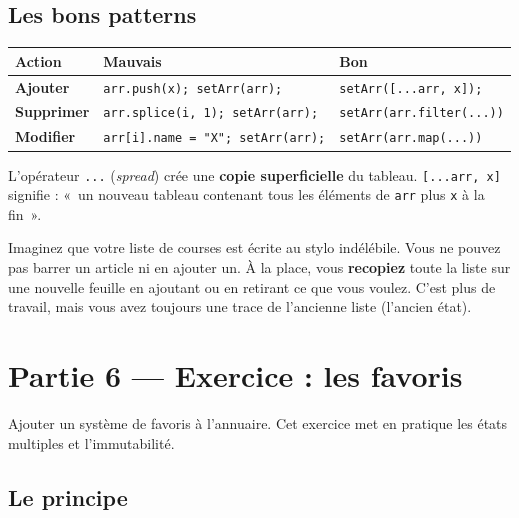 \documentclass[11pt,a4paper]{article}
\newcommand{\cmark}{\ding{51}}
\newcommand{\xmark}{\ding{55}}
\begin{document}
\subsection{Les bons patterns}

\begin{center}
\begin{tabular}{lp{5cm}p{5cm}}
\toprule
\textbf{Action} & \textbf{Mauvais} \xmark & \textbf{Bon} \cmark \\
\midrule
\textbf{Ajouter} & \texttt{arr.push(x); setArr(arr);} & \texttt{setArr([...arr, x]);} \\
\textbf{Supprimer} & \texttt{arr.splice(i, 1); setArr(arr);} & \texttt{setArr(arr.filter(...))} \\
\textbf{Modifier} & \texttt{arr[i].name = "X"; setArr(arr);} & \texttt{setArr(arr.map(...))} \\
\bottomrule
\end{tabular}
\end{center}

L'opérateur \texttt{...} (\emph{spread}) crée une \textbf{copie superficielle} du tableau. \texttt{[...arr, x]} signifie : «~un nouveau tableau contenant tous les éléments de \texttt{arr} plus \texttt{x} à la fin~».

\begin{infobox}
Imaginez que votre liste de courses est écrite au stylo indélébile. Vous ne pouvez pas barrer un article ni en ajouter un. À la place, vous \textbf{recopiez} toute la liste sur une nouvelle feuille en ajoutant ou en retirant ce que vous voulez. C'est plus de travail, mais vous avez toujours une trace de l'ancienne liste (l'ancien état).
\end{infobox}

\section{Partie 6 --- Exercice : les favoris}
\label{sec:favoris}

\begin{objectifbox}
Ajouter un système de favoris à l'annuaire. Cet exercice met en pratique les états multiples et l'immutabilité.
\end{objectifbox}

\subsection{Le principe}
\end{document}
